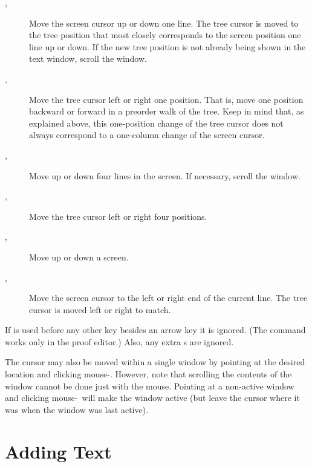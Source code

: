 \begin {description}
\item[\UP, \DOWN]{} \hfill \break
\noindent
    Move the screen cursor up or down one line.
    The tree cursor is moved to the tree position that most closely corresponds
    to the screen position one line up or down.
    If the new tree position is not already being shown in the text window,
    scroll the window.

\item[\LEFT, \RIGHT]{} \hfill \break
\noindent
    Move the tree cursor left or right one position.
    That is, move one position backward or forward in a preorder walk of the
    tree.
    Keep in mind that, as explained above,
    this one-position change of the tree cursor does not
    always correspond to a one-column change of the screen cursor.  

\item[\LONG{} \UP, \LONG{} \DOWN]{} \hfill \break
\noindent
    Move up or down four lines in the screen.
    If necessary, scroll the window.

\item[\LONG{} \LEFT, \LONG{} \RIGHT]{} \hfill \break
\noindent
    Move the tree cursor left or right four positions.

\item[\LONG{} \LONG{} \UP, \LONG{} \LONG{} \DOWN]{} \hfill \break
\noindent
    Move up or down a screen.

\item[\LONG{} \LONG{} \LEFT, \LONG{} \LONG{} \RIGHT]{} \hfill \break
\noindent
    Move the screen cursor to the left or right end of the current line.
    The tree cursor is moved left or right to match.
\end {description}

If \LONG{} is used before any other key besides an arrow key it is ignored.
(The \LONG{} \DIAG{} command works only in the proof editor.)
Also, any extra \LONG{}s are ignored.

The cursor may also be moved within a single window by pointing at the
desired location and clicking mouse-\JUMP.  However, note that scrolling
the contents of the window cannot be done just with the mouse.  Pointing at
a non-active window and clicking mouse-\JUMP\ will make the window active
(but leave the cursor where it was when the window was last active).

\section{Adding Text}

